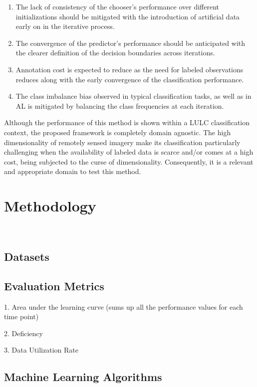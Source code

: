 \documentclass[parskip=full]{scrartcl}
\begin{document}
\begin{enumerate}
    \item The lack of consistency of the chooser's performance over different initializations should
        be mitigated with the introduction of artificial data early on in the iterative process.
    \item The convergence of the predictor's performance should be anticipated with the clearer
        definition of the decision boundaries across iterations.
    \item Annotation cost is expected to reduce as the need for labeled observations reduces along
        with the early convergence of the classification performance.
    \item The class imbalance bias observed in typical classification tasks, as well as in AL is
        mitigated by balancing the class frequencies at each iteration.
\end{enumerate}

Although the performance of this method is shown within a LULC classification context, the proposed
framework is completely domain agnostic. The high dimensionality of remotely sensed imagery make its
classification particularly challenging when the availability of labeled data is scarce and/or comes
at a high cost, being subjected to the curse of dimensionality. Consequently, it is a relevant and
appropriate domain to test this method.

\section{Methodology}~\label{sec:methodology}

\subsection{Datasets}

\subsection{Evaluation Metrics}

1. Area under the learning curve (sums up all the performance values for each time point)

2. Deficiency

3. Data Utilization Rate

\subsection{Machine Learning Algorithms}
\end{document}
